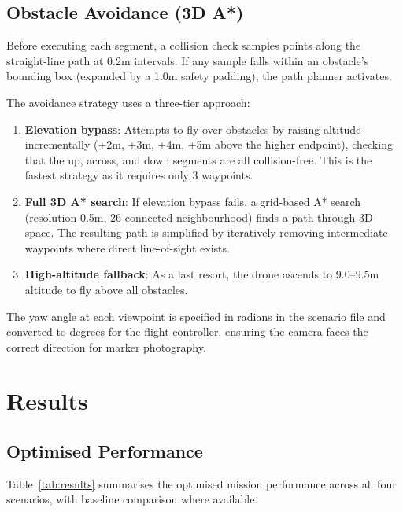 \documentclass[11pt,a4paper]{article}
\begin{document}
\subsection{Obstacle Avoidance (3D A*)}

Before executing each segment, a collision check samples points along the straight-line path at 0.2m intervals. If any sample falls within an obstacle's bounding box (expanded by a 1.0m safety padding), the path planner activates.

The avoidance strategy uses a three-tier approach:
\begin{enumerate}
    \item \textbf{Elevation bypass}: Attempts to fly over obstacles by raising altitude incrementally (+2m, +3m, +4m, +5m above the higher endpoint), checking that the up, across, and down segments are all collision-free. This is the fastest strategy as it requires only 3 waypoints.
    \item \textbf{Full 3D A* search}: If elevation bypass fails, a grid-based A* search (resolution 0.5m, 26-connected neighbourhood) finds a path through 3D space. The resulting path is simplified by iteratively removing intermediate waypoints where direct line-of-sight exists.
    \item \textbf{High-altitude fallback}: As a last resort, the drone ascends to 9.0--9.5m altitude to fly above all obstacles.
\end{enumerate}

The yaw angle at each viewpoint is specified in radians in the scenario file and converted to degrees for the flight controller, ensuring the camera faces the correct direction for marker photography.

\section{Results}

\subsection{Optimised Performance}

Table~\ref{tab:results} summarises the optimised mission performance across all four scenarios, with baseline comparison where available.
\end{document}
